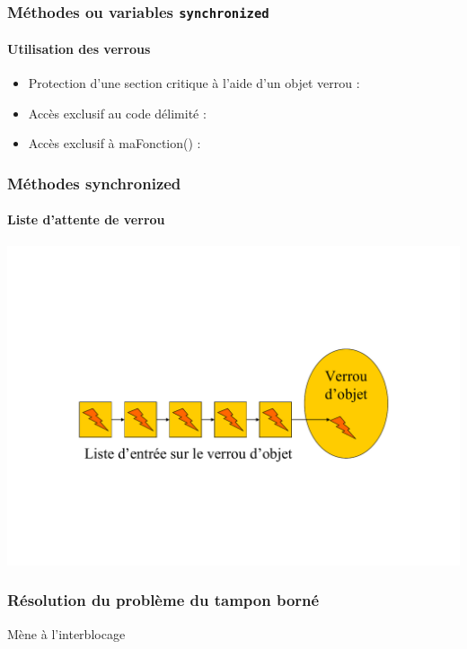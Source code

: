 \begin{frame}
\frametitle{Méthodes ou variables \texttt{synchronized}}
\framesubtitle{Utilisation des verrous}
\begin{itemize}
\item Protection d'une section critique à l'aide d'un objet verrou :
\begin{scriptsize}\end{scriptsize}
\item Accès exclusif au code délimité :
\begin{scriptsize}\end{scriptsize}
\item Accès exclusif à maFonction() :
\begin{scriptsize}\end{scriptsize}
\end{itemize}
\end{frame}

\begin{frame}
\frametitle{Méthodes synchronized}
\framesubtitle{Liste d'attente de verrou}
\includegraphics[width=\textwidth]{../illustration/methode_synchronized.pdf}
\end{frame}

\begin{frame}
\frametitle{Résolution du problème du tampon borné}
\begin{scriptsize}\end{scriptsize}
\begin{center}
{\LARGE Mène à l'interblocage}
\end{center}
\end{frame}

